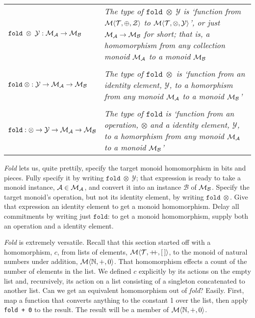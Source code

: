 \begin{center}
\begin{tabular}{ll}
  $\mathtt{fold}\;\otimes\;\mathcal{Y}:
    \mathcal{M}_{\mathcal{A}}\rightarrow\mathcal{M}_{\mathcal{B}}$
    & \parbox{2.85in}{\footnotesize\emph{The 
      type of $\mathtt{fold}\;\otimes\;\mathcal{Y}$
      is `function from $\mathcal{M}\langle{\mathcal{T}},{\oplus},{\mathcal{Z}}\rangle$ to 
      $\mathcal{M}\langle{\mathcal{T}},{\otimes},{\mathcal{Y}}\rangle$', or just $\mathcal{M}_{\mathcal{A}}\rightarrow
      \mathcal{M}_{\mathcal{B}}$ for short; that is, a homomorphism from 
      any collection monoid $\mathcal{M}_{\mathcal{A}}$
      to a monoid $\mathcal{M}_{\mathcal{B}}$}} \\
  {}&{}\\
  $\mathtt{fold}\;\otimes:\mathcal{Y}\rightarrow
    \mathcal{M}_{\mathcal{A}}\rightarrow\mathcal{M}_{\mathcal{B}}$
    & \parbox{2.85in}{\footnotesize\emph{The 
      type of $\mathtt{fold}\;\otimes$
      is `function from an identity element, $\mathcal{Y}$, to a
      homorphism from any monoid $\mathcal{M}_{\mathcal{A}}$
      to a monoid $\mathcal{M}_{\mathcal{B}}$'}}\\
  {}&{}\\
  $\mathtt{fold}:\otimes\rightarrow\mathcal{Y}\rightarrow
    \mathcal{M}_{\mathcal{A}}\rightarrow\mathcal{M}_{\mathcal{B}}$
    & \parbox{2.85in}{\footnotesize\emph{The 
      type of $\mathtt{fold}$
      is `function from an operation, $\otimes$ and a 
      identity element, $\mathcal{Y}$, to a
      homorphism from any monoid $\mathcal{M}_{\mathcal{A}}$
      to a monoid $\mathcal{M}_{\mathcal{B}}$'}}\\
  \end{tabular}
\end{center}


\emph{Fold} lets us, quite prettily, specify the target monoid homomorphism in bits and pieces. Fully specify it by writing $\mathtt{fold}\;\otimes\;\mathcal{Y}$; that expression is ready to take a monoid instance, $\mathcal{A}\in\mathcal{M}_{\mathcal{A}}$, and convert it into an instance $\mathcal{B}$ of $\mathcal{M}_{\mathcal{B}}$. Specify the target monoid's operation, but not its identity element, by writing $\mathtt{fold}\;\otimes$. Give that expression an identity element to get a monoid homomorphism. Delay all commitments by writing just $\mathtt{fold}$: to get a monoid homomorphism, supply both an operation and a identity element.


\emph{Fold} is extremely versatile. Recall that this section started off with a homomorphism, $c$, from lists of elements, $\Mon{\T}{\pp}{\emptylist}$, to the monoid of natural numbers under addition, $\mathcal{M}\langle{\mathbb{N}},{+},{0}\rangle$. That homomorphism effects a count of the number of elements in the list. We defined $c$ explicitly by its actions on the empty list and, recursively, its action on a list consisting of a singleton concatenated to another list. Can we get an equivalent homomorphism out of \emph{fold}? Easily. First, map a function that converts anything to the constant 1 over the list, then apply \verb"fold + 0" to the result. The result will be a member of $\mathcal{M}\langle{\mathbb{N}},{+},{0}\rangle$. 


